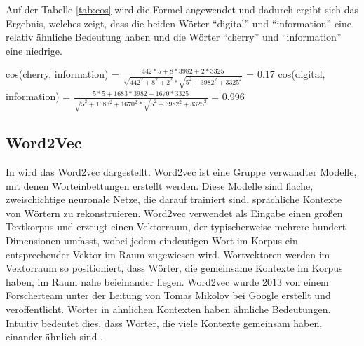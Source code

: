 \documentclass[
        ngerman,
        paper=a4,
        numbers=noendperiod,
]{scrreprt}
\begin{document}
Auf der Tabelle \ref{tab:cos} wird die Formel angewendet und dadurch ergibt sich das Ergebnis, welches zeigt, dass die beiden Wörter \enquote{digital} und \enquote{information} eine relativ ähnliche Bedeutung haben und die Wörter \enquote{cherry} und \enquote{information} eine niedrige. 


\begin{xequation-} 
\centering cos(cherry, information) = $\frac{442\ast 5+8\ast3982+2\ast3325}{\sqrt{442^{2} +8^{2} +2^{2}}\ast \sqrt{5^{2} +3982^{2} +3325^{2}}}$ = 0.17
\newline
\newline
\centering cos(digital, information) = $\frac{5\ast 5+1683\ast3982+1670\ast3325}{\sqrt{5^{2} +1683^{2} +1670^{2}}\ast \sqrt{5^{2} +3982^{2} +3325^{2}}}$ = 0.996 
\end{xequation-} 




\subsection{Word2Vec}
In \citep{mikolov2013efficient} wird das Word2vec dargestellt.
Word2vec ist eine Gruppe verwandter Modelle, mit denen Worteinbettungen erstellt werden. Diese Modelle sind flache, zweischichtige neuronale Netze, die darauf trainiert sind, sprachliche Kontexte von Wörtern zu rekonstruieren. Word2vec verwendet als Eingabe einen großen Textkorpus und erzeugt einen Vektorraum, der typischerweise mehrere hundert Dimensionen umfasst, wobei jedem eindeutigen Wort im Korpus ein entsprechender Vektor im Raum zugewiesen wird. Wortvektoren werden im Vektorraum so positioniert, dass Wörter, die gemeinsame Kontexte im Korpus haben, im Raum nahe beieinander liegen. Word2vec wurde 2013 von einem Forscherteam unter der Leitung von Tomas Mikolov bei Google erstellt und veröffentlicht. Wörter in ähnlichen Kontexten haben ähnliche Bedeutungen. Intuitiv bedeutet dies, dass Wörter, die viele Kontexte gemeinsam haben, einander ähnlich sind \citep{goldberg2014word2vec}. 




















\end{document}
